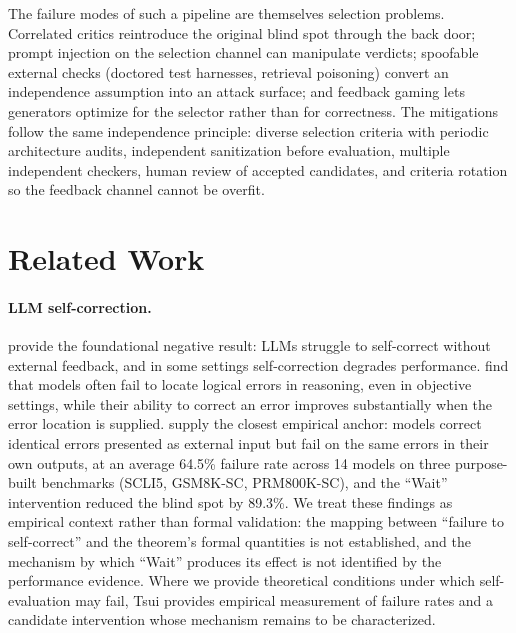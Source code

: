 \documentclass[a4paper,journal]{IAENGtran}
\begin{document}
The failure modes of such a pipeline are themselves selection problems. Correlated
critics reintroduce the original blind spot through the back door; prompt injection on
the selection channel can manipulate verdicts; spoofable external checks (doctored
test harnesses, retrieval poisoning) convert an independence assumption into an attack
surface; and feedback gaming lets generators optimize for the selector rather than for
correctness. The mitigations follow the same independence principle: diverse selection
criteria with periodic architecture audits, independent sanitization before evaluation,
multiple independent checkers, human review of accepted candidates, and criteria
rotation so the feedback channel cannot be overfit.

\section{Related Work}
\label{sec:related}

\paragraph{LLM self-correction.} \cite{huang2024selfcorrect} provide the foundational
negative result: LLMs struggle to self-correct without external feedback, and in some
settings self-correction degrades performance. \cite{tyen2024llmsstepbystep} find that
models often fail to locate logical errors in reasoning, even in objective settings,
while their ability to correct an error improves substantially when the error location
is supplied. \cite{tsui2025selfcorrection}
supply the closest empirical anchor: models correct identical errors presented as
external input but fail on the same errors in their own outputs, at an average 64.5\%
failure rate across 14 models on three purpose-built benchmarks (SCLI5, GSM8K-SC,
PRM800K-SC), and the ``Wait'' intervention reduced the blind spot by 89.3\%. We treat
these findings as empirical context rather than formal validation: the mapping between
``failure to self-correct'' and the theorem's formal quantities is not established, and
the mechanism by which ``Wait'' produces its effect is not identified by the
performance evidence. Where we provide theoretical conditions under which
self-evaluation may fail, Tsui provides empirical measurement of failure rates and a
candidate intervention whose mechanism remains to be characterized.
\end{document}

